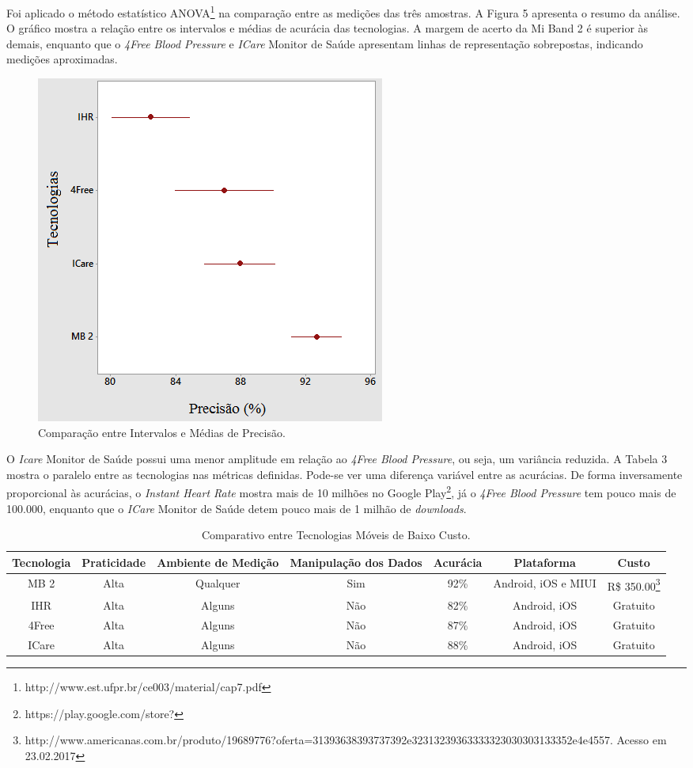 \documentclass[12pt]{article}
\begin{document}
Foi aplicado o método estatístico ANOVA\footnote{http://www.est.ufpr.br/ce003/material/cap7.pdf} na comparação entre as medições das três amostras. A Figura 5 apresenta o resumo da análise. O gráfico mostra a relação entre os intervalos e médias de acurácia das tecnologias. A margem de acerto da Mi Band 2 é superior às demais, enquanto que o \textit{4Free Blood Pressure} e \textit{ICare} Monitor de Saúde apresentam linhas de representação sobrepostas, indicando medições aproximadas.

\begin{figure}[H]
\centering
\includegraphics[width=.29\linewidth, frame]{Grafico4.png}
\caption{Comparação entre Intervalos e Médias de Precisão.}
\label{fig:exampleFig5}
\end{figure}

O \textit{Icare} Monitor de Saúde possui uma menor amplitude em relação ao \textit{4Free Blood Pressure}, ou seja, um variância reduzida. A Tabela 3 mostra o paralelo entre as tecnologias nas métricas definidas. Pode-se ver uma diferença variável entre as acurácias. De forma inversamente proporcional às acurácias, o \textit{Instant Heart Rate} mostra mais de 10 milhões no Google Play\footnote{https://play.google.com/store?}, já o \textit{4Free Blood Pressure} tem pouco mais de 100.000, enquanto que o \textit{ICare} Monitor de Saúde detem pouco mais de 1 milhão de \textit{downloads}.

\begin{table}[h!]
  \centering
  \caption{Comparativo entre Tecnologias Móveis de Baixo Custo.}
  \label{tab:label_test}
  \begin{adjustbox}{max width=\textwidth}
  \begin{tabular}{*{7}{|c}|}%
  \hline
  Tecnologia & Praticidade & Ambiente de Medição & Manipulação dos Dados & Acurácia & Plataforma & Custo \\
  \hline
  MB 2 & Alta & Qualquer & Sim & 92\% & Android, iOS e MIUI & R\$ 350.00\footnote{http://www.americanas.com.br/produto/19689776?oferta=31393638393737392e32313239363333323030303133352e4e4557. Acesso em 23.02.2017} \\
  \hline
  IHR & Alta & Alguns & Não & 82\% & Android, iOS & Gratuito \\
  \hline
  4Free & Alta & Alguns & Não & 87\% & Android, iOS & Gratuito \\
  \hline
  ICare & Alta & Alguns & Não & 88\% & Android, iOS & Gratuito \\
  \hline
\end{tabular}
\end{adjustbox}
\end{table}
\end{document}
